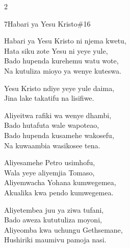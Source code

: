 \documentclass{article}
\begin{document}
\begin{multicols}{2}
\begin{hymn}{7}{Habari ya Yesu Kristo}{\#16}
\begin{stanza}
Habari ya Yesu Kristo ni njema kwetu,\\
Hata siku zote Yesu ni yeye yule,\\
Bado hupenda kurehemu watu wote,\\
Na kutuliza mioyo ya wenye kuteswa.
\end{stanza}
\begin{chorus}
Yesu Kristo ndiye yeye yule daima,\\
Jina lake takatifu na lisifiwe.
\end{chorus}
\begin{stanza}
Aliyeitwa rafiki wa wenye dhambi,\\
Bado hutafuta wale wapoteao,\\
Bado hupenda kusamehe wakosefu,\\
Na kuwaambia wasikosee tena.
\end{stanza}
\begin{stanza}
Aliyesamehe Petro usimhofu,\\
Wala yeye aliyemjia Tomaso,\\
Aliyemwacha Yohana kumwegemea,\\
Akualika kwa pendo kumwegemea.
\end{stanza}
\begin{stanza}
Aliyetembea juu ya ziwa tufani,\\
Bado aweza kututuliza moyoni,\\
Aliyeomba kwa uchungu Gethsemane,\\
Hushiriki maumivu pamoja nasi.
\end{stanza}
\end{hymn}


\end{multicols}
\end{document}
